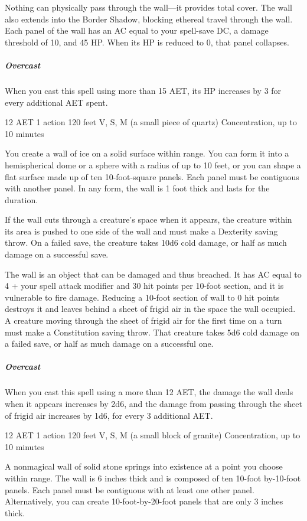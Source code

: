 Nothing can physically pass through the wall---it provides total cover. The wall also extends into the Border Shadow, blocking ethereal travel through the wall. Each panel of the wall has an AC equal to your spell-save DC, a damage threshold of 10, and 45 HP. When its HP is reduced to 0, that panel collapses.

\subparagraph*{Overcast} When you cast this spell using more than 15 AET, its HP increases by 3 for every additional AET spent.


{12 AET}
{1 action}
{120 feet}
{V, S, M (a small piece of quartz)}
{Concentration, up to 10 minutes}

You create a wall of ice on a solid surface within range. You can form it into a hemispherical dome or a sphere with a radius of up to 10 feet, or you can shape a flat surface made up of ten 10-foot-square panels. Each panel must be contiguous with another panel. In any form, the wall is 1 foot thick and lasts for the duration.

If the wall cuts through a creature's space when it appears, the creature within its area is pushed to one side of the wall and must make a Dexterity saving throw. On a failed save, the creature takes 10d6 cold damage, or half as much damage on a successful save.

The wall is an object that can be damaged and thus breached. It has AC equal to 4 + your spell attack modifier and 30 hit points per 10-foot section, and it is vulnerable to fire damage. Reducing a 10-foot section of wall to 0 hit points destroys it and leaves behind a sheet of frigid air in the space the wall occupied. A creature moving through the sheet of frigid air for the first time on a turn must make a Constitution saving throw. That creature takes 5d6 cold damage on a failed save, or half as much damage on a successful one.

\subparagraph*{Overcast} When you cast this spell using a more than 12 AET, the damage the wall deals when it appears increases by 2d6, and the damage from passing through the sheet of frigid air increases by 1d6, for every 3 additional AET.


{12 AET}
{1 action}
{120 feet}
{V, S, M (a small block of granite)}
{Concentration, up to 10 minutes}

A nonmagical wall of solid stone springs into existence at a point you choose within range. The wall is 6 inches thick and is composed of ten 10-foot by-10-foot panels. Each panel must be contiguous with at least one other panel. Alternatively, you can create 10-foot-by-20-foot panels that are only 3 inches thick.

